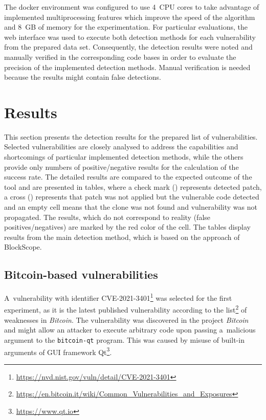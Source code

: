 The docker environment was configured to use 4~CPU cores to take advantage of implemented multiprocessing features which
improve the speed of the algorithm and 8~GB of memory for the experimentation. For particular evaluations, the web interface
was used to execute both detection methods for each vulnerability from the prepared data set. Consequently, the detection
results were noted and manually verified in the corresponding code bases in order to evaluate the precision of the implemented
detection methods. Manual verification is needed because the results might contain false detections.

\section{Results}
This section presents the detection results for the prepared list of vulnerabilities. Selected vulnerabilities are closely
analysed to address the capabilities and shortcomings of particular implemented detection methods, while the others provide
only numbers of positive/negative results for the calculation of the success rate.
The detailed results are compared to the expected outcome of the tool and are presented in tables, where a check mark (\checkmark)
represents detected patch, a cross (\stimes) represents that patch was not applied but the vulnerable code detected and an empty
cell means that the clone was not found and vulnerability was not propagated. The results, which do not correspond to reality
(false positives/negatives) are marked by the red color of the cell. The tables display results from the main detection method,
which is based on the approach of BlockScope.

\subsection*{Bitcoin-based vulnerabilities}
A~vulnerability with identifier CVE-2021-3401\footnote{\href{https://nvd.nist.gov/vuln/detail/CVE-2021-3401}
{https://nvd.nist.gov/vuln/detail/CVE-2021-3401}} was selected for the first experiment, as it is the latest published
vulnerability according to the list\footnote{\href{https://en.bitcoin.it/wiki/Common_Vulnerabilities_and_Exposures}
{https://en.bitcoin.it/wiki/Common\_Vulnerabilities\_and\_Exposures}} of weaknesses in \emph{Bitcoin}. The vulnerability was discovered
in the project \emph{Bitcoin} and might allow an attacker to execute arbitrary code upon passing a~malicious argument
to the \texttt{bitcoin-qt} program. This was caused by misuse of built-in arguments of GUI framework Qt\footnote{\href{
https://www.qt.io}{https://www.qt.io}}.

